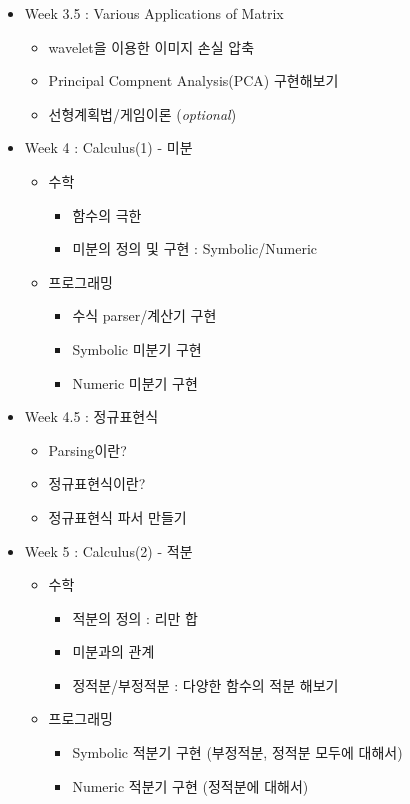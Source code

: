 \documentclass[11pt, a4paper]{article}
\begin{document}
\begin{center}
\begin{flushleft}
\begin{itemize}
\item Week 3.5 : Various Applications of Matrix 

\begin{itemize} 
\item wavelet을 이용한 이미지 손실 압축
\item Principal Compnent Analysis(PCA) 구현해보기
\item 선형계획법/게임이론 (\textit{optional}) 
\end{itemize}

\item Week 4 : Calculus(1) - 미분

\begin{itemize} 
\item 수학 
\begin{itemize}
\item 함수의 극한 
\item 미분의 정의 및 구현 : Symbolic/Numeric
\end{itemize} 
\item 프로그래밍 
\begin{itemize} 
\item 수식 parser/계산기 구현 
\item Symbolic 미분기 구현 
\item Numeric 미분기 구현 
\end{itemize} 
\end{itemize}

\item Week 4.5 : 정규표현식
\begin{itemize} 
\item Parsing이란?
\item 정규표현식이란?
\item 정규표현식 파서 만들기
\end{itemize}


\item Week 5 : Calculus(2) - 적분

\begin{itemize} 
\item 수학 
\begin{itemize}
\item 적분의 정의 : 리만 합
\item 미분과의 관계 
\item 정적분/부정적분 : 다양한 함수의 적분 해보기  
\end{itemize} 
\item 프로그래밍 
\begin{itemize} 
\item Symbolic 적분기 구현 (부정적분, 정적분 모두에 대해서)
\item Numeric 적분기 구현 (정적분에 대해서)
\end{itemize} 
\end{itemize}


\end{itemize}
\end{flushleft}
\end{center}
\end{document}
